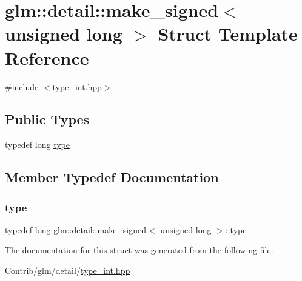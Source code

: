 \hypertarget{structglm_1_1detail_1_1make__signed_3_01unsigned_01long_01_4}{}\section{glm\+:\+:detail\+:\+:make\+\_\+signed$<$ unsigned long $>$ Struct Template Reference}
\label{structglm_1_1detail_1_1make__signed_3_01unsigned_01long_01_4}


{\ttfamily \#include $<$type\+\_\+int.\+hpp$>$}

\subsection*{Public Types}
\begin{DoxyCompactItemize}
\item 
typedef long \mbox{\hyperlink{structglm_1_1detail_1_1make__signed_3_01unsigned_01long_01_4_a055abdf7ba75d133a9784c2749f2336f}{type}}
\end{DoxyCompactItemize}


\subsection{Member Typedef Documentation}
\mbox{\label{structglm_1_1detail_1_1make__signed_3_01unsigned_01long_01_4_a055abdf7ba75d133a9784c2749f2336f}} 
\subsubsection{\texorpdfstring{type}{type}}
{\footnotesize\ttfamily typedef long \mbox{\hyperlink{structglm_1_1detail_1_1make__signed}{glm\+::detail\+::make\+\_\+signed}}$<$ unsigned long $>$\+::\mbox{\hyperlink{structglm_1_1detail_1_1make__signed_3_01unsigned_01long_01_4_a055abdf7ba75d133a9784c2749f2336f}{type}}}



The documentation for this struct was generated from the following file\+:\begin{DoxyCompactItemize}
\item 
Contrib/glm/detail/\mbox{\hyperlink{type__int_8hpp}{type\+\_\+int.\+hpp}}\end{DoxyCompactItemize}
